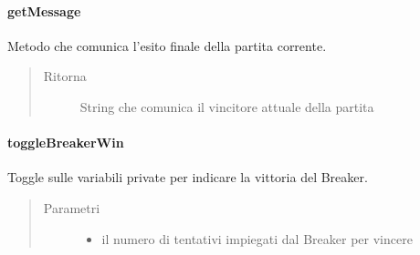 \documentclass[letterpaper,10pt,italian]{sphinxmanual}
\begin{document}
\paragraph{getMessage}
\label{\detokenize{source/it/unicam/cs/pa/mastermind/gamecore/CurrentGameStats:getmessage}}

\begin{fulllineitems}
\label{\detokenize{source/it/unicam/cs/pa/mastermind/gamecore/CurrentGameStats:it.unicam.cs.pa.mastermind.gamecore.CurrentGameStats.getMessage()}}
Metodo che comunica l’esito finale della partita corrente.
\begin{quote}\begin{description}
\item[{Ritorna}] \leavevmode
String che comunica il vincitore attuale della partita

\end{description}\end{quote}

\end{fulllineitems}



\paragraph{toggleBreakerWin}
\label{\detokenize{source/it/unicam/cs/pa/mastermind/gamecore/CurrentGameStats:togglebreakerwin}}

\begin{fulllineitems}
\label{\detokenize{source/it/unicam/cs/pa/mastermind/gamecore/CurrentGameStats:it.unicam.cs.pa.mastermind.gamecore.CurrentGameStats.toggleBreakerWin(int)}}
Toggle sulle variabili private per indicare la vittoria del Breaker.
\begin{quote}\begin{description}
\item[{Parametri}] \leavevmode\begin{itemize}
\item {} 
 \textendash{} il numero di tentativi impiegati dal Breaker per vincere

\end{itemize}

\end{description}\end{quote}

\end{fulllineitems}
\end{document}
